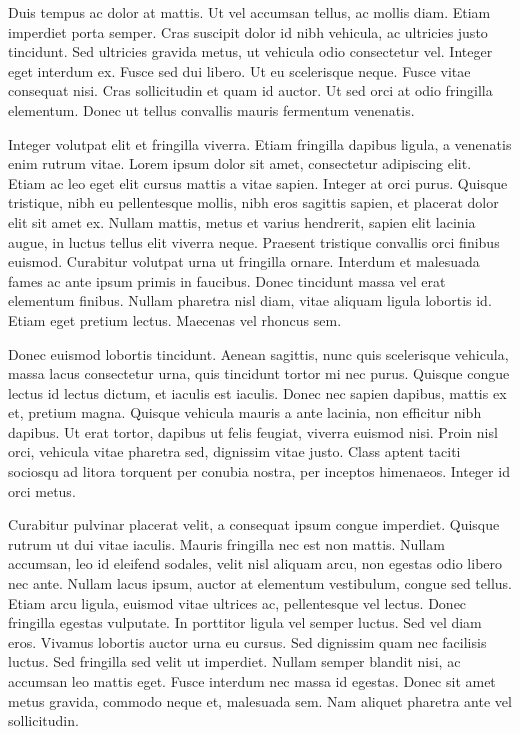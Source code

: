 \documentclass{homework}
\begin{document}
Duis tempus ac dolor at mattis. Ut vel accumsan tellus, ac mollis diam. Etiam imperdiet porta semper. Cras suscipit dolor id nibh vehicula, ac ultricies justo tincidunt. Sed ultricies gravida metus, ut vehicula odio consectetur vel. Integer eget interdum ex. Fusce sed dui libero. Ut eu scelerisque neque. Fusce vitae consequat nisi. Cras sollicitudin et quam id auctor. Ut sed orci at odio fringilla elementum. Donec ut tellus convallis mauris fermentum venenatis.

Integer volutpat elit et fringilla viverra. Etiam fringilla dapibus ligula, a venenatis enim rutrum vitae. Lorem ipsum dolor sit amet, consectetur adipiscing elit. Etiam ac leo eget elit cursus mattis a vitae sapien. Integer at orci purus. Quisque tristique, nibh eu pellentesque mollis, nibh eros sagittis sapien, et placerat dolor elit sit amet ex. Nullam mattis, metus et varius hendrerit, sapien elit lacinia augue, in luctus tellus elit viverra neque. Praesent tristique convallis orci finibus euismod. Curabitur volutpat urna ut fringilla ornare. Interdum et malesuada fames ac ante ipsum primis in faucibus. Donec tincidunt massa vel erat elementum finibus. Nullam pharetra nisl diam, vitae aliquam ligula lobortis id. Etiam eget pretium lectus. Maecenas vel rhoncus sem.

Donec euismod lobortis tincidunt. Aenean sagittis, nunc quis scelerisque vehicula, massa lacus consectetur urna, quis tincidunt tortor mi nec purus. Quisque congue lectus id lectus dictum, et iaculis est iaculis. Donec nec sapien dapibus, mattis ex et, pretium magna. Quisque vehicula mauris a ante lacinia, non efficitur nibh dapibus. Ut erat tortor, dapibus ut felis feugiat, viverra euismod nisi. Proin nisl orci, vehicula vitae pharetra sed, dignissim vitae justo. Class aptent taciti sociosqu ad litora torquent per conubia nostra, per inceptos himenaeos. Integer id orci metus.

Curabitur pulvinar placerat velit, a consequat ipsum congue imperdiet. Quisque rutrum ut dui vitae iaculis. Mauris fringilla nec est non mattis. Nullam accumsan, leo id eleifend sodales, velit nisl aliquam arcu, non egestas odio libero nec ante. Nullam lacus ipsum, auctor at elementum vestibulum, congue sed tellus. Etiam arcu ligula, euismod vitae ultrices ac, pellentesque vel lectus. Donec fringilla egestas vulputate. In porttitor ligula vel semper luctus. Sed vel diam eros. Vivamus lobortis auctor urna eu cursus. Sed dignissim quam nec facilisis luctus. Sed fringilla sed velit ut imperdiet. Nullam semper blandit nisi, ac accumsan leo mattis eget. Fusce interdum nec massa id egestas. Donec sit amet metus gravida, commodo neque et, malesuada sem. Nam aliquet pharetra ante vel sollicitudin.
\end{document}
